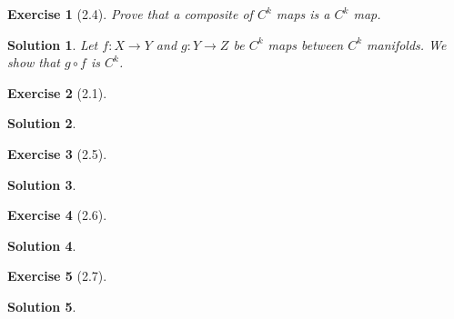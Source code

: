 \documentclass{article}
\theoremstyle{plain}
\newtheorem*{ex}{Exercise}
\theoremstyle{nonumberplain}
\newtheorem{sol}{Solution}
\begin{document}
\begin{ex}[2.4]
Prove that a composite of $C^k$ maps is a $C^k$ map.
\end{ex}

\begin{sol}
Let $f \colon X \to Y$ and $g \colon Y \to Z$ be $C^k$ maps between $C^k$ manifolds. We show that $g \circ f$ is $C^k$.
\end{sol}

\begin{ex}[2.1]

\end{ex}

\begin{sol}

\end{sol}

\begin{ex}[2.5]

\end{ex}

\begin{sol}

\end{sol}

\begin{ex}[2.6]

\end{ex}

\begin{sol}

\end{sol}

\begin{ex}[2.7]

\end{ex}

\begin{sol}

\end{sol}
\end{document}
